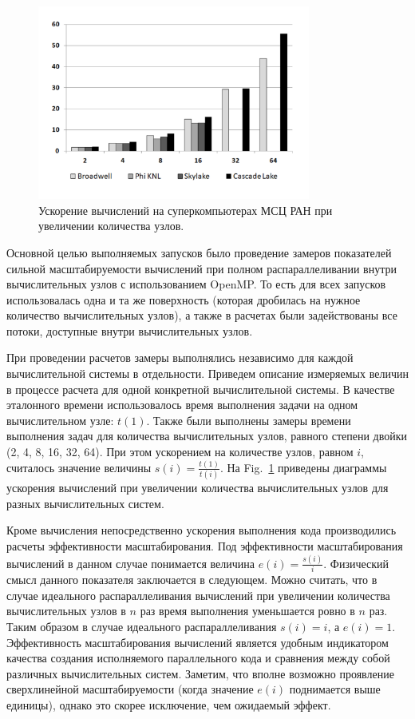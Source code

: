 \documentclass[
11pt,%
tightenlines,%
twoside,%
onecolumn,%
nofloats,%
nobibnotes,%
nofootinbib,%
superscriptaddress,%
noshowpacs,%
centertags]%
{revtex4}
\begin{document}
\begin{figure}[h]
\includegraphics[width=0.8\textwidth]{pics/speedup.pdf}
\caption{Ускорение вычислений на суперкомпьютерах МСЦ РАН при увеличении количества узлов.}\label{fig:speedup}
\end{figure}

Основной целью выполняемых запусков было проведение замеров показателей сильной масштабируемости вычислений при полном распараллеливании внутри вычислительных узлов с использованием OpenMP.
То есть для всех запусков использовалась одна и та же поверхность (которая дробилась на нужное количество вычислительных узлов), а также в расчетах были задействованы все потоки, доступные внутри вычислительных узлов. 

При проведении расчетов замеры выполнялись независимо для каждой вычислительной системы в отдельности.
Приведем описание измеряемых величин в процессе расчета для одной конкретной вычислительной системы.
В качестве эталонного времени использовалось время выполнения задачи на одном вычислительном узле: $t(1)$.
Также были выполнены замеры времени выполнения задач для количества вычислительных узлов, равного степени двойки (2, 4, 8, 16, 32, 64).
При этом ускорением на количестве узлов, равном $i$, считалось значение величины $s(i) = \frac{t(1)}{t(i)}$.
На Fig.~\ref{fig:speedup} приведены диаграммы ускорения вычислений при увеличении количества вычислительных узлов для разных вычислительных систем.

Кроме вычисления непосредственно ускорения выполнения кода производились расчеты эффективности масштабирования.
Под эффективности масштабирования вычислений в данном случае понимается величина $e(i) = \frac{s(i)}{i}$.
Физический смысл данного показателя заключается в следующем.
Можно считать, что в случае идеального распараллеливания вычислений при увеличении количества вычислительных узлов в $n$ раз время выполнения уменьшается ровно в $n$ раз.
Таким образом в случае идеального распараллеливания $s(i) = i$, а $e(i) = 1$.
Эффективность масштабирования вычислений является удобным индикатором качества создания исполняемого параллельного кода и сравнения между собой различных вычислительных систем.
Заметим, что вполне возможно проявление сверхлинейной масштабируемости (когда значение $e(i)$ поднимается выше единицы), однако это скорее исключение, чем ожидаемый эффект.
\end{document}
